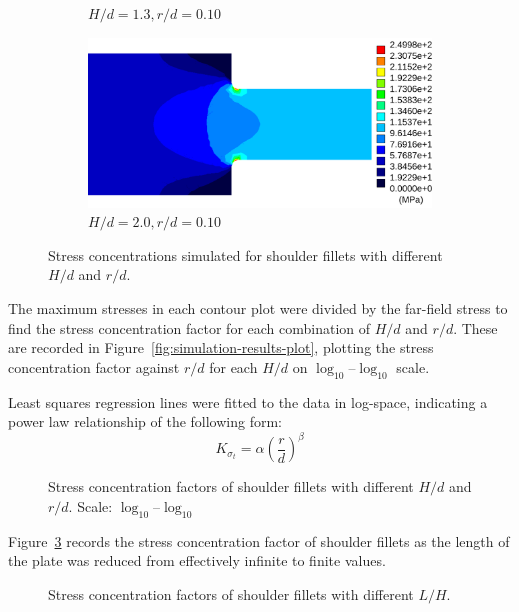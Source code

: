 \documentclass[a4paper,11pt,twocolumn]{article}
\begin{document}
\begin{figure}[t]
\begin{subfigure}[b]{0.48\textwidth}
        \caption{$H/d = 1.3,r/d = 0.10$}
    \end{subfigure}
    \begin{subfigure}[b]{0.48\textwidth}
        \includegraphics[width=\textwidth]{img/Hd2-0_rd0-10.pdf}
        \caption{$H/d = 2.0,r/d = 0.10$}
    \end{subfigure}
    \caption{Stress concentrations simulated for shoulder fillets with
        different $H/d$ and $r/d$.}
    \label{fig:simulation-results-contour}
\end{figure}

The maximum stresses in each contour plot were divided by the far-field stress 
to find the stress concentration factor for each combination of $H/d$ and
$r/d$. These are recorded in Figure~\vref{fig:simulation-results-plot}, plotting
the stress concentration factor against $r/d$ for each $H/d$ on 
$\log_{10}$--$\log_{10}$ scale.

Least squares regression lines were fitted to the data in log-space, indicating
a power law relationship of the following form:
\begin{equation}
    K_{\sigma_t} = \alpha\left(\frac{r}{d}\right)^\beta
\end{equation}

\begin{figure}[H]
    \small
    \centering
    \def\svgwidth{\linewidth}
    
    \caption{Stress concentration factors of shoulder fillets with
        different $H/d$ and $r/d$. Scale: $\log_{10}$--$\log_{10}$}
    \label{fig:simulation-results-plot}
\end{figure}

Figure~\ref{fig:simulation-results-length} records the stress concentration
factor of shoulder fillets as the length of the plate was reduced from
effectively infinite to finite values.


\begin{figure}[H]
    \small
    \centering
    \def\svgwidth{\linewidth}
    
    \caption{Stress concentration factors of shoulder fillets with different
        $L/H$.}
    \label{fig:simulation-results-length}
\end{figure}
\end{document}
